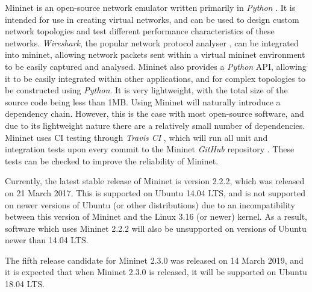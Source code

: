 

Mininet is an open-source network emulator written primarily in \textit{Python} \cite{mininet}. It is intended for use in creating virtual networks, and can be used to design custom network topologies and test different performance characteristics of these networks.
\textit{Wireshark}, the popular network protocol analyser \cite{wireshark}, can be integrated into mininet, allowing network packets sent within a virtual mininet environment to be easily captured and analysed.
Mininet also provides a \textit{Python} API, allowing it to be easily integrated within other applications, and for complex topologies to be constructed using \textit{Python}.
It is very lightweight, with the total size of the source code being less than 1MB.
Using Mininet will naturally introduce a dependency chain. However, this is the case with most open-source software, and due to its lightweight nature there are a relatively small number of dependencies.
Mininet uses CI testing through \textit{Travis CI} \cite{travis_ci}, which will run all unit and integration tests upon every commit to the Mininet \textit{GitHub} repository \cite{github}. These tests can be checked to improve the reliability of Mininet.

Currently, the latest stable release of Mininet is version 2.2.2, which was released on 21 March 2017. This is supported on Ubuntu 14.04 LTS, and is not supported on newer versions of Ubuntu (or other distributions) due to an incompatibility between this version of Mininet and the Linux 3.16 (or newer) kernel. As a result, software which uses Mininet 2.2.2 will also be unsupported on versions of Ubuntu newer than 14.04 LTS.

The fifth release candidate for Mininet 2.3.0 was released on 14 March 2019, and it is expected that when Mininet 2.3.0 is released, it will be supported on Ubuntu 18.04 LTS.
